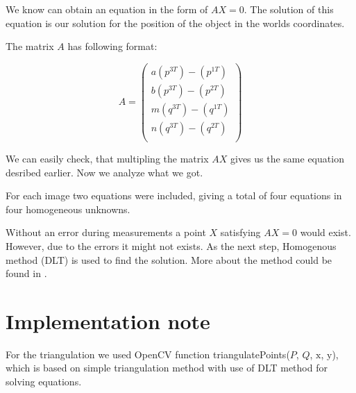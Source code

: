 We know can obtain an equation in the form of $AX = 0$. The solution of this
equation is our solution for the position of the object in the worlds
coordinates.

The matrix $A$ has following format:

\[
A = \begin{pmatrix}
a(p^{3T}) - (p^{1T}) \\
b(p^{3T}) - (p^{2T}) \\
m(q^{3T}) - (q^{1T}) \\
n(q^{3T}) - (q^{2T}) \\
\end{pmatrix}
\]

We can easily check, that multipling the matrix $AX$ gives us the same equation
desribed earlier. Now we analyze what we got.

For each image two equations were included, giving a total of four equations in
four homogeneous unknowns.

Without an error during measurements a point $X$ satisfying $AX = 0$ would
exist. However, due to the errors it might not exists. As the next step, Homogenous
method (DLT) is used to find the solution. More about the method could be found
in \citet*{multiple-view-geometry}.

\section{Implementation note}
For the triangulation we used OpenCV function triangulatePoints($P$, $Q$,
$\mathrm{x}$, $\mathrm{y}$), which is based on simple triangulation method with use of DLT
method for solving equations.
